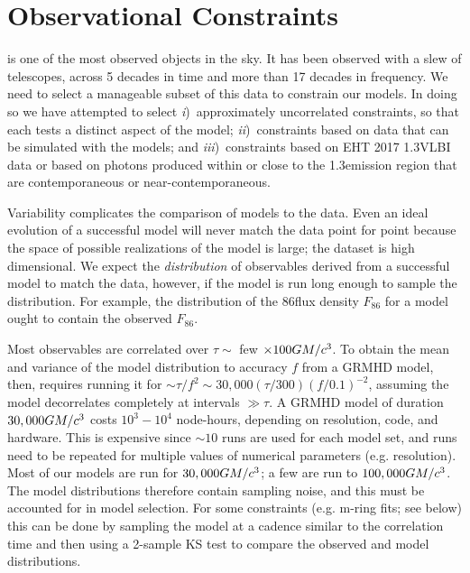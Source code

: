 \section{Observational Constraints}\label{sec:observations}

\sgra is one of the most observed objects in the sky.  It has been observed with a slew of telescopes, across 5 decades in time and more than 17 decades in frequency. We need to select a manageable subset of this data to constrain our models. In doing so we have attempted to select
\emph{i})~approximately uncorrelated constraints, so that each tests a distinct aspect of the model;
\emph{ii})~constraints based on data that can be simulated with the models; and
\emph{iii})~constraints based on EHT 2017 1.3\mm VLBI data or based on photons produced within or close to the 1.3\mm emission region that are contemporaneous or near-contemporaneous.

Variability complicates the comparison of \sgra models to the data. Even an ideal evolution of a successful model will never match the data point for point because the space of possible realizations of the model is large; the dataset is high dimensional.  We expect the {\em distribution} of  observables derived from a successful model to match the data, however, if the model is run long enough to sample the distribution.  For example, the distribution of the 86\GHz flux density $F_{86}$ for a model ought to contain the observed $F_{86}$.

Most observables are correlated over $\tau\sim$ few $\times 100 GM/c^3$.  To obtain the mean and variance of the model distribution to accuracy $f$ from a GRMHD model, then, requires running it for $\sim \tau/f^2 \sim 30,000 (\tau/300) (f/0.1)^{-2}$, assuming the model decorrelates completely at intervals $\gg \tau$.  A GRMHD model of duration $30,000 GM/c^3$  costs $10^3-10^4$ node-hours, depending on resolution, code, and hardware.  This is expensive since $\sim 10$ runs are used for each model set, and runs need to be repeated for multiple values of numerical parameters (e.g. resolution).  Most of our models are run for $30,000 GM/c^3$; a few are run to $100,000 GM/c^3$.  The model distributions therefore contain sampling noise, and this must be accounted for in model selection.  For some  constraints (e.g. m-ring fits; see below) this can be done by sampling the model at a cadence similar to the correlation time and then using a 2-sample KS test to compare the observed and model distributions.


